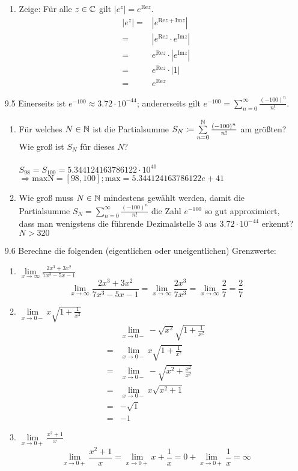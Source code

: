 \documentclass{HM}
\begin{document}
\begin{enumerate}
\begin{enumerate}
	\item Zeige: Für alle $z\in\mathbb{C}$ gilt $|e^z|=e^{\text{Re} z}$.
	\begin{align*}
		|e^z|
		=&|e^{\text{Re} z +\text{Im} z}|\\
		=&|e^{\text{Re} z}\cdot e^{\text{Im} z}|\\
		=&e^{\text{Re} z}\cdot |e^{\text{Im} z}|\\
		=&e^{\text{Re} z}\cdot |1|\\
		=&e^{\text{Re} z}
	\end{align*}
\end{enumerate}
\item[9.5] Einerseits ist $e^{-100}\approx 3.72\cdot 10^{-44}$; andererseits gilt $e^{-100}=\sum\limits_{n=0}^\infty\frac{(-100)^n}{n!}$.
\begin{enumerate}
	\item Für welches $N\in\mathbb{N}$ ist die Partialsumme $S_N\coloneqq\sum\limits_{n=0}^{\mathbb{N}}\frac{(-100)^n}{n!}$ am größten? Wie groß ist $S_N$ für dieses $N$?\\\\
	 $S_{98}=S_{100}=5.344124163786122\cdot 10^{41}$\\
	
	$\Rightarrow\text{maxN} = [98, 100]; \text{max} = 5.344124163786122e+41$
	
	\item Wie groß muss $N\in\mathbb{N}$ mindestens gewählt werden, damit die Partialsumme $S_N=\sum\limits_{n=0}^\infty\frac{(-100)^n}{n!}$ die Zahl $e^{-100}$ so gut approximiert, dass man wenigstens die führende Dezimalstelle $3$ aus $3.72\cdot 10^{-44}$ erkennt?\\
$N>320$	 
\end{enumerate}

\item[9.6] Berechne die folgenden (eigentlichen oder uneigentlichen) Grenzwerte:
\begin{enumerate}
	\item $\lim\limits_{x\to\infty} \frac{2x^3+3x^2}{7x^3-5x-1}$
	$$\lim\limits_{x\to\infty} \frac{2x^3+3x^2}{7x^3-5x-1}=\lim\limits_{x\to\infty} \frac{2x^3}{7x^3}=\lim\limits_{x\to\infty} \frac{2}{7}=\frac{2}{7}$$
	\item $\lim\limits_{x\to0-} x\sqrt{1+\frac{1}{x^2}}$
	\begin{align*}
		&\lim\limits_{x\to0-} -\sqrt{x^2}\sqrt{1+\frac{1}{x^2}}\\
		=&\lim\limits_{x\to0-} x\sqrt{1+\frac{1}{x^2}}\\
		=&\lim\limits_{x\to0-} -\sqrt{x^2+\frac{x^2}{x^2}}\\
		=&\lim\limits_{x\to0-} x\sqrt{x^2+1}\\
		=& -\sqrt{1}\\
		=& -1
	\end{align*}
	\item $\lim\limits_{x\to0+}\frac{x^2+1}{x}$
	$$\lim\limits_{x\to0+}\frac{x^2+1}{x}
	=\lim\limits_{x\to0+}x+\frac{1}{x}
	=0+\lim\limits_{x\to0+}\frac{1}{x}
	=\infty$$
	

\end{enumerate}
\end{enumerate}
\end{document}
